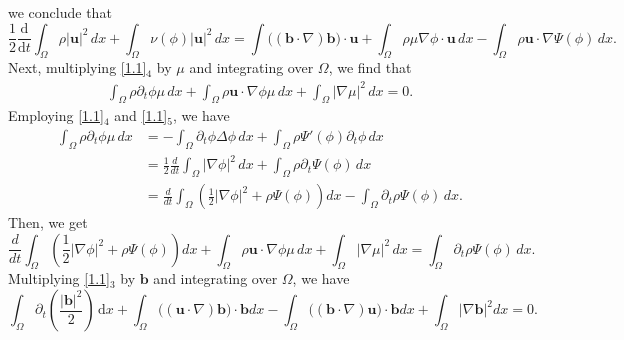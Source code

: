 \documentclass[11pt]{article}
\numberwithin{equation}{section}
\begin{document}
we conclude  that
\begin{equation}\label{3.3}
\frac{1}{2} \frac{\mathrm{d}}{\mathrm{d}t} \int_{\Omega} \rho |\mathbf{u}|^2 \, dx + \int_{\Omega} \nu(\phi) | \mathbf{u}|^2 \, dx = \int\big(( \mathbf{b}\cdot\nabla)  \mathbf{b}\big)\cdot \mathbf{u}+\int_{\Omega} \rho \mu \nabla \phi \cdot\mathbf{u} \, dx - \int_{\Omega} \rho \mathbf{u} \cdot \nabla \Psi(\phi) \, dx.
\end{equation}
Next, multiplying \eqref{1.1}$_{4}$ by \(\mu\) and integrating over \(\Omega\), we find that
\begin{align*}
\int_{\Omega} \rho \partial_t \phi \mu \, dx + \int_{\Omega} \rho  \mathbf{u} \cdot \nabla \phi \mu \, dx + \int_{\Omega} |\nabla \mu|^2 \, dx = 0.
\end{align*}
Employing \eqref{1.1}$_{4}$ and \eqref{1.1}$_{5}$, we have
\begin{align*}
\int_{\Omega} \rho \partial_t \phi \mu \, dx &= - \int_{\Omega} \partial_t \phi \Delta \phi \, dx + \int_{\Omega} \rho \Psi'(\phi) \partial_t \phi \, dx \\
&= \frac{1}{2} \frac{d}{dt} \int_{\Omega} |\nabla \phi|^2 \, dx + \int_{\Omega} \rho \partial_t \Psi(\phi) \, dx \\
&= \frac{d}{dt} \int_{\Omega} \left( \frac{1}{2} |\nabla \phi|^2 + \rho \Psi(\phi) \right) dx - \int_{\Omega} \partial_t \rho \Psi(\phi) \, dx.
\end{align*}
Then, we get
\begin{equation}\label{3.4}
\frac{d}{dt} \int_{\Omega} \left( \frac{1}{2} |\nabla \phi|^2 + \rho \Psi(\phi) \right) dx + \int_{\Omega} \rho \mathbf{u} \cdot \nabla \phi \mu \, dx + \int_{\Omega} |\nabla \mu|^2 \, dx = \int_{\Omega} \partial_t \rho \Psi(\phi) \, dx.
\end{equation}
Multiplying  \eqref{1.1}$_{3}$ by \(\mathbf{b}\) and integrating over \(\Omega\), we have
\begin{equation}\label{3.5}
\int_{\Omega} \partial_t \left(\frac{\vert\mathbf{b}\vert^2}{2}\right)\,\mathrm{d}x+\int_{\Omega} \big((\mathbf{u}\cdot\nabla) \mathbf{b}\big)\cdot \mathbf{b}dx-\int_{\Omega}\big((\mathbf{b}\cdot\nabla) \mathbf{u}\big)\cdot \mathbf{b}dx+\int_{\Omega}|\nabla \mathbf{b}|^2 dx=0.
\end{equation}
\end{document}
